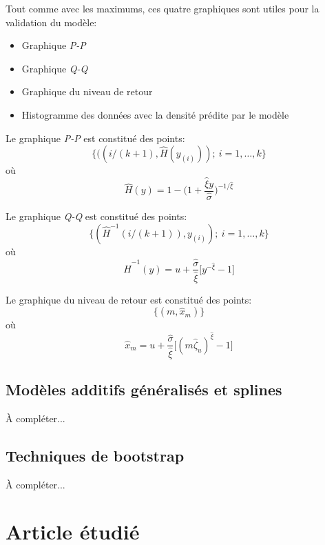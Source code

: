 \documentclass[11pt]{report}
\numberwithin{equation}{section}
\begin{document}
Tout comme avec les maximums, ces quatre graphiques sont utiles pour la validation du modèle:

\begin{itemize}
\item Graphique \textit{P-P}
\item Graphique \textit{Q-Q}
\item Graphique du niveau de retour
\item Histogramme des données avec la densité prédite par le modèle 
\end{itemize}

Le graphique \textit{P-P} est constitué des points:
\begin{equation*}
\{ ((i/(k+1), \hat{H}(y_{(i)}));\ i=1,\dots,k\}
\end{equation*}
où
\begin{equation*}
\hat{H}(y) = 1 - \Bigg(1+\frac{\hat\xi y}{\hat\sigma}\Bigg)^{-1/\hat\xi}
\end{equation*}

Le graphique \textit{Q-Q} est constitué des points:
\begin{equation*}
\{(\hat{H}^{-1}(i/(k+1)), y_{(i)});\ i=1,\dots,k\}
\end{equation*}
où
\begin{equation*}
\hat{H}^{-1}(y) = u + \frac{\hat\sigma}{\hat\xi}\Big[y^{-\hat\xi}-1\Big]
\end{equation*}

Le graphique du niveau de retour est constitué des points:
\begin{equation*}
\{(m, \hat{x}_m)\}
\end{equation*}
où
\begin{equation*}
{\hat{x}_m = u + \frac{\hat\sigma}{\hat\xi} \Big[(m {\hat\zeta}_u)^{\hat\xi} -1\Big]}
\end{equation*}


\section{Modèles additifs généralisés et splines}
À compléter...

\section{Techniques de bootstrap}
À compléter...

\chapter{Article étudié}
\label{chap:article} 
\end{document}
